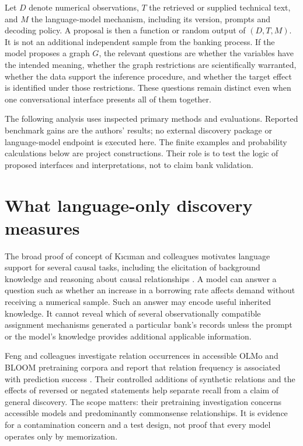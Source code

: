 Let $D$ denote numerical observations, $T$ the retrieved or supplied technical
text, and $M$ the language-model mechanism, including its version, prompts and
decoding policy. A proposal is then a function or random output of
$(D,T,M)$. It is not an additional independent sample from the banking process.
If the model proposes a graph $G$, the relevant questions are whether the
variables have the intended meaning, whether the graph restrictions are
scientifically warranted, whether the data support the inference procedure,
and whether the target effect is identified under those restrictions. These
questions remain distinct even when one conversational interface presents all
of them together.

The following analysis uses inspected primary methods and evaluations. Reported
benchmark gains are the authors' results; no external discovery package or
language-model endpoint is executed here. The finite examples and probability
calculations below are project constructions. Their role is to test the logic
of proposed interfaces and interpretations, not to claim bank validation.

\section{What language-only discovery measures}

The broad proof of concept of K{\i}c{\i}man and colleagues motivates language
support for several causal tasks, including the elicitation of background
knowledge and reasoning about causal relationships
\citep{v12_la_2305_00050}. A model can answer a question such as whether an
increase in a borrowing rate affects demand without receiving a numerical
sample. Such an answer may encode useful inherited knowledge. It cannot reveal
which of several observationally compatible assignment mechanisms generated a
particular bank's records unless the prompt or the model's knowledge provides
additional applicable information.

Feng and colleagues investigate relation occurrences in accessible OLMo and
BLOOM pretraining corpora and report that relation frequency is associated with
prediction success \citep{v12_la_2407_19638}. Their controlled additions of
synthetic relations and the effects of reversed or negated statements help
separate recall from a claim of general discovery. The scope matters: their
pretraining investigation concerns accessible models and predominantly
commonsense relationships. It is evidence for a contamination concern and a
test design, not proof that every model operates only by memorization.

